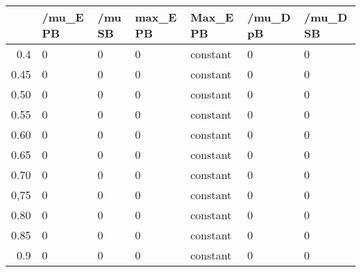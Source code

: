 \begin{table}[ht]
\centering
\begin{tabular}{rllllll}
  \hline
 & /mu\_E PB & /mu SB & max\_E PB & Max\_E PB & /mu\_D pB & /mu\_D SB \\ 
  \hline
0.4 & 0 & 0 & 0 & constant & 0 & 0 \\ 
  0.45 & 0 & 0 & 0 & constant & 0 & 0 \\ 
  0.50 & 0 & 0 & 0 & constant & 0 & 0 \\ 
  0.55 & 0 & 0 & 0 & constant & 0 & 0 \\ 
  0.60 & 0 & 0 & 0 & constant & 0 & 0 \\ 
  0.65 & 0 & 0 & 0 & constant & 0 & 0 \\ 
  0.70 & 0 & 0 & 0 & constant & 0 & 0 \\ 
  0,75 & 0 & 0 & 0 & constant & 0 & 0 \\ 
  0.80 & 0 & 0 & 0 & constant & 0 & 0 \\ 
  0.85 & 0 & 0 & 0 & constant & 0 & 0 \\ 
  0.9 & 0 & 0 & 0 & constant & 0 & 0 \\ 
   \hline
\end{tabular}
\end{table}
